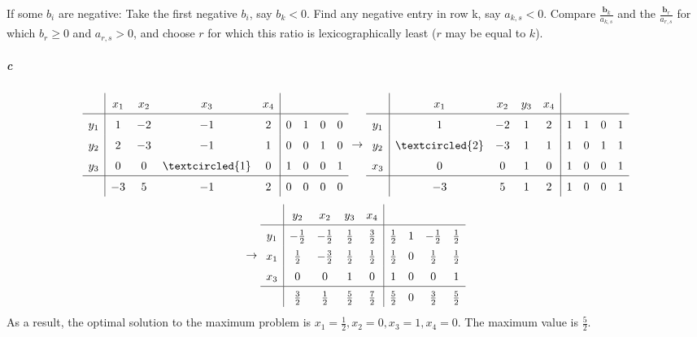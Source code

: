 \documentclass[22pt]{article}
\begin{document}
		 If some $b_i$ are negative: Take the first negative $b_i$, say $b_k<0$. Find any negative entry in row k, say $a_{k,s}<0$. Compare $\frac{\mathbf{b}_k}{a_{k,s}}$ and the $\frac{\mathbf{b}_r}{a_{r,s}}$ for which $b_r \geq 0$ and $a_{r,s} > 0$, and choose $r$ for which this ratio is lexicographically least ($r$ may be equal to $k$).

		\subparagraph{c}
		\begin{equation}
		\renewcommand\arraystretch{1.5}
			\begin{matrix}
			\begin{array}{c|cccc|cccc}
			   & x_1 & x_2 & x_3 & x_4 & & & & \\ \hline
			  y_1 & 1 & -2 & -1 & 2 & 0 & 1 & 0 & 0 \\ 
			  y_2 & 2 & -3 & -1 & 1 & 0 & 0 & 1 & 0 \\
			  y_3 & 0 & 0 & \textcircled{1} & 0 & 1 & 0 & 0 &1 \\ \hline
			  & -3 & 5 & -1 & 2 & 0 & 0& 0&0 \\ 
			\end{array}
			\end{matrix}
			\rightarrow
			\begin{matrix}
			\begin{array}{c|cccc|cccc}
			   & x_1 & x_2 & y_3 & x_4 & & & & \\ \hline
			  y_1 & 1 & -2 & 1 & 2 & 1 & 1 & 0 & 1 \\ 
			  y_2 & \textcircled{2} & -3 & 1 & 1 & 1 & 0 & 1 & 1 \\
			  x_3 & 0 & 0 & 1 & 0 & 1 & 0 & 0 &1 \\ \hline
			  & -3 & 5 & 1 & 2 & 1 & 0& 0&1 \\ 
			\end{array}
			\end{matrix}
			\end{equation}
			\begin{equation}
			 \rightarrow 
			 \renewcommand\arraystretch{1.5}
			 \begin{matrix}
			\begin{array}{c|cccc|cccc}
			   & y_2 & x_2 & y_3 & x_4 & & & & \\ \hline
			  y_1 & -\frac{1}{2} & -\frac{1}{2} & \frac{1}{2} & \frac{3}{2} & \frac{1}{2} & 1 & -\frac{1}{2} & \frac{1}{2} \\ 
			  x_1 & \frac{1}{2} & -\frac{3}{2} & \frac{1}{2} & \frac{1}{2} & \frac{1}{2} & 0 & \frac{1}{2} & \frac{1}{2} \\
			  x_3 & 0 & 0 & 1 & 0 & 1 & 0 & 0 &1 \\ \hline
			  & \frac{3}{2} & \frac{1}{2} & \frac{5}{2} & \frac{7}{2} & \frac{5}{2} & 0& \frac{3}{2}&\frac{5}{2} \\ 
			\end{array}
			\end{matrix}
		\end{equation}
		As a result, the optimal solution to the maximum problem is $x_1 = \frac{1}{2}, x_2= 0, x_3 = 1, x_4 =0$. The maximum value is $\frac{5}{2}$.
\end{document}
